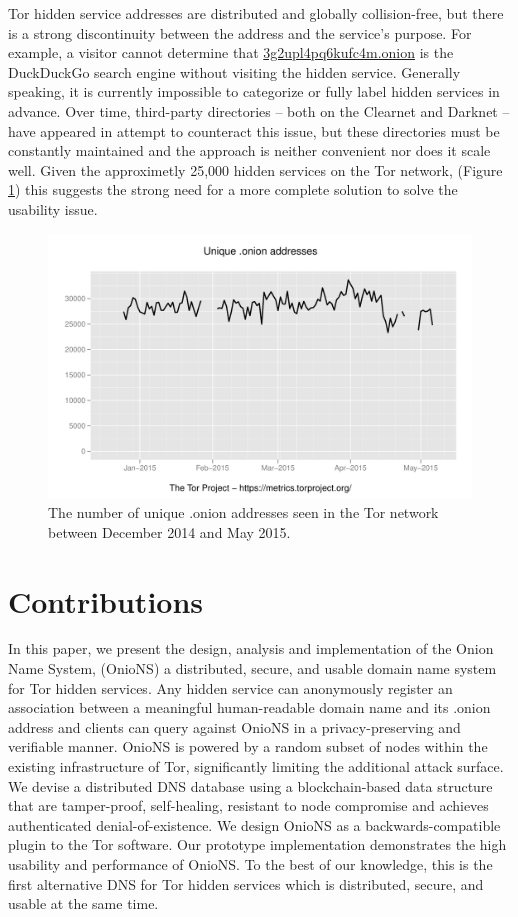 \documentclass{sig-alternate}
\begin{document}
Tor hidden service addresses are distributed and globally collision-free, but there is a strong discontinuity between the address and the service's purpose. For example, a visitor cannot determine that \url{3g2upl4pq6kufc4m.onion} is the DuckDuckGo search engine without visiting the hidden service. Generally speaking, it is currently impossible to categorize or fully label hidden services in advance. Over time, third-party directories -- both on the Clearnet and Darknet -- have appeared in attempt to counteract this issue, but these directories must be constantly maintained and the approach is neither convenient nor does it scale well. Given the approximetly 25,000 hidden services on the Tor network,  (Figure \ref{fig:OnionCount}) this suggests the strong need for a more complete solution to solve the usability issue. 

\begin{figure}[htbp]
	\centering
	\includegraphics[width=\linewidth]{../images/Tor/onion_2014-10_2015-05.pdf}
	\caption{The number of unique .onion addresses seen in the Tor network between December 2014 and May 2015.\cite{kadianakis2015extrapolating}\cite{TorMetrics}}
	\label{fig:OnionCount}
\end{figure}

\section{Contributions}

In this paper, we present the design, analysis and implementation of the Onion Name System, (OnioNS) a distributed, secure, and usable domain name system for Tor hidden services. Any hidden service can anonymously register an association between a meaningful human-readable domain name and its .onion address and clients can query against OnioNS in a privacy-preserving and verifiable manner. OnioNS is powered by a random subset of nodes within the existing infrastructure of Tor, significantly limiting the additional attack surface. We devise a distributed DNS database using a blockchain-based data structure that are tamper-proof, self-healing, resistant to node compromise and achieves authenticated denial-of-existence. We design OnioNS as a backwards-compatible plugin to the Tor software. Our prototype implementation demonstrates the high usability and performance of OnioNS. To the best of our knowledge, this is the first alternative DNS for Tor hidden services which is distributed, secure, and usable at the same time.
\end{document}
